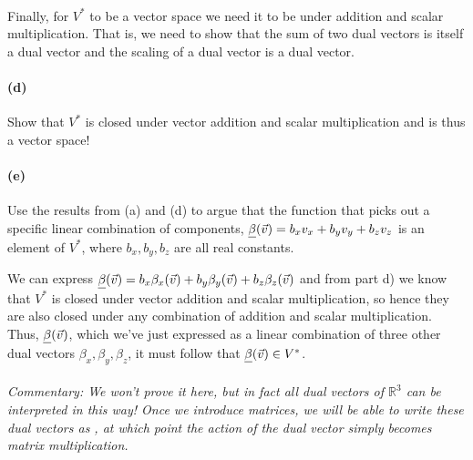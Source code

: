\documentclass{article}
\begin{document}
\paragraph{}
Finally, for $V^{*}$ to be a vector space we need it to be  under addition and scalar multiplication.  That is, we
need to show that the sum of two dual vectors is itself a dual vector and the scaling of a dual vector is a dual vector.

\paragraph{(d)}		\extrapart
Show that $V^{*}$ is closed under vector addition and scalar multiplication and is thus a vector space!


\paragraph{(e)}
Use the results from (a) and (d) to argue that the function that picks out a specific linear combination of components, 
$\underline{\beta}(\vec{v}) = b_{x}v_{x} + b_{y}v_{y} 
+ b_{z}v_{z}$ is an element of $V^{*}$, where $b_{x}, b_{y}, b_{z}$ are all real constants.

\begin{solution}
    We can express $\underline{\beta}(\vec v) = b_x\beta_x(\vec v) + b_y\beta_y(\vec v) + b_z\beta_z(\vec v)$ and from part d) we know that $V^*$ is closed under vector addition and scalar multiplication, so hence they are also closed under any combination of addition and scalar multiplication. Thus, $\underline{\beta}(\vec v)$, which we've just expressed as a linear combination of three other dual vectors $\beta_x, \beta_y, \beta_z$, it must follow that $\underline{\beta}(\vec v) \in V^*$.
\end{solution}


\paragraph{}
\noindent\emph{Commentary: We won't prove it here, but in fact \emph{all} dual vectors of $\mathbb{R}^{3}$ can be interpreted in this way!  Once we introduce matrices, we will be able to write 
these dual vectors as , at which point the action of the dual vector simply becomes matrix multiplication.}


\bigskip
\dphline
\pagebreak
\end{document}
